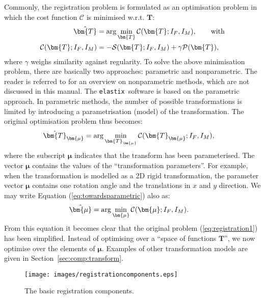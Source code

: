 \documentclass[]{report}
\newcommand{\elastix}{\texttt{elastix}}
\newcommand{\vmu}{\bm{\mu}}
\newcommand{\vT}{\bm{T}}
\newcommand{\vTm}{\bm{T}_{\vmu}}
\newcommand{\CC}{\mathcal{C}}
\newcommand{\Sim}{\mathcal{S}}
\newcommand{\Pen}{\mathcal{P}}
\begin{document}
Commonly, the registration problem is formulated as an optimisation
problem in which the cost function $\mathcal{C}$ is minimised w.r.t.
$\vT$:
\begin{align}
\hat \vT &= \arg \min_{\vT} \CC (\vT; I_F,I_M), \qquad \text{with} \label{eq:registration1}\\
\CC(\vT; I_F,I_M) &= -\Sim(\vT; I_F,I_M) + \gamma
\Pen(\vT),\label{eq:registration2}
\end{align}
where $\gamma$ weighs similarity against regularity. To solve the above
minimisation problem, there are basically two approaches: parametric and
nonparametric. The reader is referred to \cite{Fis04:Unified} for an overview
on nonparametric methods, which are not discussed in this manual. The \elastix\
software is based on the parametric approach. In parametric methods, the number
of possible transformations is limited by introducing a parametrisation (model)
of the transformation. The original optimisation problem thus becomes:
\begin{align}
\hat\vTm &= \arg \min_{\vTm}
 \CC(\vTm ; I_F,I_M), \label{eq:towardsparametric}
\end{align}
where the subscript $\vmu$ indicates that the transform has been
parameterised. The vector $\vmu$ contains the values of the
``transformation parameters''. For example, when the
transformation is modelled as a 2D rigid transformation, the
parameter vector $\vmu$ contains one rotation angle and the
translations in $x$ and $y$ direction. We may write Equation
(\ref{eq:towardsparametric}) also as:
\begin{align}
\hat\vmu &= \arg \min_{\vmu} \CC(\vmu; I_F,I_M).
\label{eq:parametric}
\end{align}
From this equation it becomes clear that the original problem
(\ref{eq:registration1}) has been simplified. Instead of optimising
over a ``space of functions $\vT$'', we now optimise over the
elements of $\vmu$. Examples of other transformation models are given
in Section~\ref{sec:comp:transform}.

\begin{figure}[tb]
\centering
\texttt{[image: images/registrationcomponents.eps]}
\caption{The basic registration components.}
\label{fig:registrationcomponents}
\end{figure}
\end{document}
